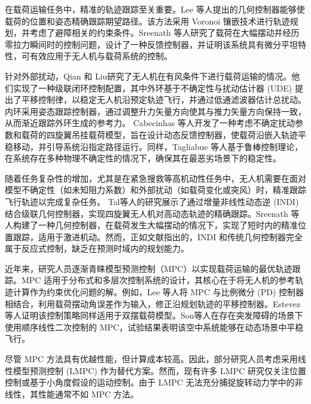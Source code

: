 \documentclass[lang=chs, degree=master, blindreview=false, winfonts=true]{yanputhesis}
\begin{document}
在载荷运输任务中，精准的轨迹跟踪至关重要。Lee 等人\cite{lee2015collision,lee2017geometric}提出的几何控制器能够使载荷的位置和姿态精确跟踪期望路径。该方法采用 Voronoi 镶嵌技术进行轨迹规划，并考虑了避障相关的约束条件。Sreenath 等人\cite{sreenath2013trajectory}研究了载荷在大幅摆动并经历零拉力瞬间时的控制问题，设计了一种反馈控制器，并证明该系统具有微分平坦特性，可有效应用于无人机与载荷系统的控制。

针对外部扰动，Qian 和 Liu\cite{qian2019path}研究了无人机在有风条件下进行载荷运输的情况。他们实现了一种级联闭环控制配置，其中外环基于不确定性与扰动估计器 (UDE) 提出了平移控制律，以稳定无人机沿预定轨迹飞行，并通过低通滤波器估计总扰动。内环采用姿态跟踪控制器，通过调整升力矢量方向使其与推力矢量方向保持一致，从而渐近跟踪外环生成的参考力。
Cabecinhas 等人\cite{cabecinhas2019trajectory}开发了一种考虑不确定扰动参数和载荷的四旋翼吊挂载荷模型，旨在设计动态反馈控制器，使载荷沿嵌入轨迹平稳移动，并引导系统沿指定路径运行。同样，Tagliabue 等人\cite{2019Robust}基于鲁棒控制理论，在系统存在多种物理不确定性的情况下，确保其在最恶劣场景下的稳定性。

随着任务复杂性的增加，尤其是在紧急搜救等高机动性任务中，无人机需要在面对模型不确定性（如未知阻力系数）和外部扰动（如载荷变化或突风）时，精准跟踪飞行轨迹以完成复杂任务。
Tal等人\cite{2021Accurate}的研究展示了通过增量非线性动态逆 (INDI) 结合级联几何控制器，实现四旋翼无人机对高动态轨迹的精确跟踪。Sreenath 等人\cite{sreenath2013geometric}构建了一种几何控制器，在载荷发生大幅摆动的情况下，实现了短时内的精准位置跟踪，适用于激进机动。然而，正如文献指出的，INDI 和传统几何控制器完全属于反应式控制，缺乏在预测时域内的规划能力。

近年来，研究人员逐渐青睐模型预测控制（MPC）以实现载荷运输的最优轨迹跟踪\cite{urbina2021predictive}。MPC 适用于分布式和多层次控制系统的设计，其核心在于将无人机的参考轨迹计算作为约束优化问题的解。例如，Lee 等人\cite{lee2015study}将 MPC 与比例微分 (PD) 控制器相结合，利用载荷摆动角误差作为输入，修正沿规划轨迹的平移控制器。Estevez 等人\cite{estevez2021hybrid}证明该控制策略同样适用于双摆载荷模型。Son等人\cite{son2018model}在存在突发障碍的场景下使用顺序线性二次控制的 MPC，试验结果表明该空中系统能够在动态场景中平稳飞行。

尽管 MPC 方法具有优越性能，但计算成本较高\cite{norouzi2022deep}。因此，部分研究人员考虑采用线性模型预测控制 (LMPC) 作为替代方案。然而，现有许多 LMPC 研究仅关注位置控制\cite{bangura2014real}或基于小角度假设的运动控制\cite{alexis2014trajectory}。由于 LMPC 无法充分捕捉旋转动力学中的非线性，其性能通常不如 MPC 方法\cite{nguyen2021model}。
\end{document}
